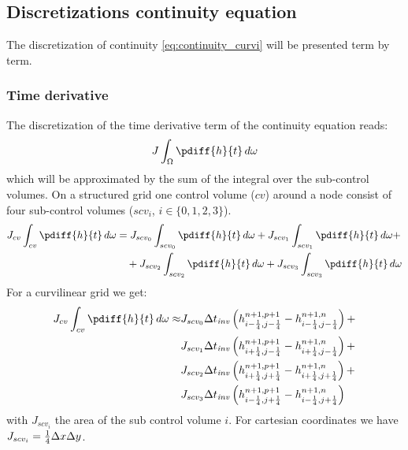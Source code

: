 \subsection{Discretizations continuity equation}
The discretization of continuity \autoref{eq:continuity_curvi} will be presented term by term.
\subsubsection{Time derivative}
The discretization of the time derivative term of the continuity equation reads:
\begin{align}
    J \int_{\Omega} \pdiff{h}{t}\, d\omega
\end{align}
which will be approximated by the sum of the integral over the sub-control volumes.
On a structured grid one control volume ($cv$) around a node consist of four sub-control volumes ($scv_i$, $i\in\{0,1,2,3\}$).
\begin{align}
    J_{cv}\int_{cv} \pdiff{h}{t}\, d\omega &=
    J_{scv_0}\int_{scv_0} \pdiff{h}{t}\, d\omega +
    J_{scv_1}\int_{scv_1} \pdiff{h}{t}\, d\omega +
    \nonumber \\*
    &\quad
    +J_{scv_2}\int_{scv_2} \pdiff{h}{t}\, d\omega +
    J_{scv_3}\int_{scv_3} \pdiff{h}{t}\, d\omega
\end{align}
For a curvilinear grid we get:
\begin{align}
    J_{cv}\int_{cv} \pdiff{h}{t}\, d\omega \approx &
    J_{scv_0}\Dtinv \left( h^{n+1,p+1}_{i-\quart, j-\quart} -  h^{n+1,n}_{i-\quart, j-\quart} \right) +
    \nonumber \\*
    &J_{scv_1}\Dtinv \left( h^{n+1,p+1}_{i+\quart, j-\quart} -  h^{n+1,n}_{i+\quart, j-\quart} \right) +
    \nonumber \\*
    &J_{scv_2}\Dtinv \left( h^{n+1,p+1}_{i+\quart, j+\quart} -  h^{n+1,n}_{i+\quart, j+\quart} \right) +
    \nonumber \\*
    &J_{scv_3}\Dtinv \left( h^{n+1,p+1}_{i-\quart, j+\quart} -  h^{n+1,n}_{i-\quart, j+\quart} \right)
\end{align}
with $J_{scv_i}$ the area of the sub control volume $i$.
For cartesian coordinates we have $J_{scv_i} = \frac{1}{4} \Delta x\Delta y$.

